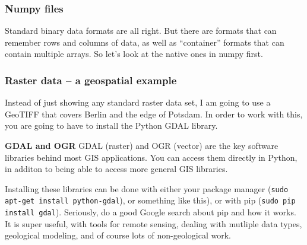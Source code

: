 \documentclass[a4paper,10pt]{scrartcl}
\begin{document}
\subsubsection{Numpy files}

Standard binary data formats are all right. But there are formats that can remember rows and columns of data, as well as ``container'' formats that can contain multiple arrays. So let's look at the native ones in numpy first.



\subsubsection{Raster data -- a geospatial example}

Instead of just showing any standard raster data set, I am going to use a GeoTIFF that covers Berlin and the edge of Potsdam. In order to work with this, you are going to have to install the Python GDAL library.

\begin{framed}
\noindent\textbf{GDAL and OGR}
GDAL (raster) and OGR (vector) are the key software libraries behind most GIS applications. You can access them directly in Python, in additon to being able to access more general GIS libraries.
\end{framed}

Installing these libraries can be done with either your package manager (\lstinline{sudo apt-get install python-gdal}), or something like this), or with pip (\lstinline{sudo pip install gdal}). Seriously, do a good Google search about pip and how it works. It is super useful, with tools for remote sensing, dealing with mutliple data types, geological modeling, and of course lots of non-geological work.


\end{document}
